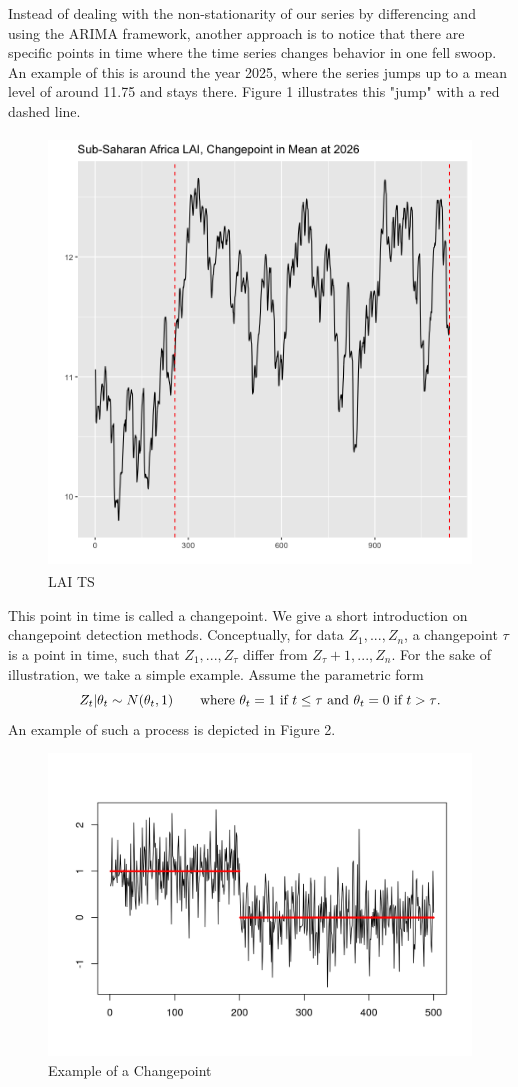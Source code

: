 \documentclass[12pt]{article}
\newcommand{\no}{\noindent}
\begin{document}
\no  Instead of dealing with the non-stationarity of our series by differencing and using the ARIMA framework, another approach is to notice that there are specific points in time where the time series changes behavior in one fell swoop. An example of this is around the year 2025, where the series jumps up to a mean level of around 11.75 and stays there. Figure 1 illustrates this "jump" with a red dashed line.
\begin{figure}[h]
	\centering
	\includegraphics[width=5in, height=4.5in]{../img/changepoint_LAI.png}
	\caption{LAI TS}
\end{figure}

This point in time is called a changepoint. We give a short introduction on changepoint detection methods.\clearpage
{} Conceptually, for data $Z_1,...,Z_n$, a changepoint $\tau$ is a point in time, such that $Z_1,...,Z_\tau$ differ from  $Z_\tau+1,...,Z_n$. For the sake of illustration, we take a simple example. Assume the parametric form
\begin{equation*}
	Z_t|\theta_t\sim N(\theta_t,1) \tag*{where $\theta_t=1 ~\text{if}~ t\leq\tau$ and $\theta_t=0 ~\text{if}~ t>\tau$}.
\end{equation*} An example of such a process is depicted in Figure 2.
\begin{figure}[h]
	\centering
	\includegraphics[width=0.75\linewidth]{../img/changepointex.png}
	\caption{Example of a Changepoint}
\end{figure}
\end{document}
